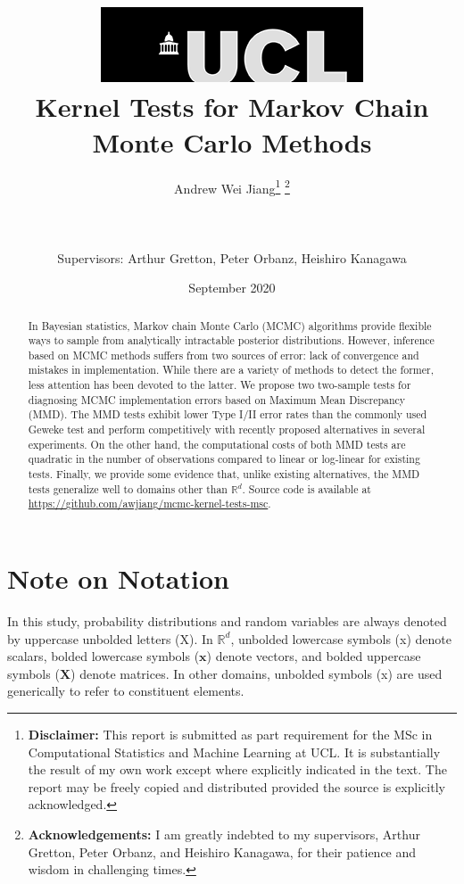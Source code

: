 \documentclass[a4paper,11pt]{article}
\title{  	{ \includegraphics[scale=.5]{figures/ucl_logo.png}}\\
{{\Huge Kernel Tests for Markov Chain Monte Carlo Methods}}\\
		}
\date{September 2020}
\author{Andrew Wei Jiang\thanks{
{\bf Disclaimer:}
This report is submitted as part requirement for the MSc in Computational Statistics and Machine Learning at UCL. It is
substantially the result of my own work except where explicitly indicated in the text. The report may be freely copied and distributed provided the source is explicitly acknowledged.
\newline}
\thanks{
{\bf Acknowledgements:}
I am greatly indebted to my supervisors, Arthur Gretton, Peter Orbanz, and Heishiro Kanagawa, for their patience and wisdom in challenging times.
\newline}
\\ \\
\\ \\
Supervisors: Arthur Gretton, Peter Orbanz, Heishiro Kanagawa}
\begin{document}
\maketitle
\thispagestyle{empty}
\onehalfspacing

\newpage
\begin{abstract}
    In Bayesian statistics, Markov chain Monte Carlo (MCMC) algorithms provide flexible ways to sample from analytically intractable posterior distributions. However, inference based on MCMC methods suffers from two sources of error: lack of convergence and mistakes in implementation. While there are a variety of methods to detect the former, less attention has been devoted to the latter. We propose two two-sample tests for diagnosing MCMC implementation errors based on Maximum Mean Discrepancy (MMD). The MMD tests exhibit lower Type I/II error rates than the commonly used Geweke test \cite{geweke_getting_2004} and perform competitively with recently proposed alternatives in several experiments. On the other hand, the computational costs of both MMD tests are quadratic in the number of observations compared to linear or log-linear for existing tests. Finally, we provide some evidence that, unlike existing alternatives, the MMD tests generalize well to domains other than $\mathbb{R}^{d}$. Source code is available at \url{https://github.com/awjiang/mcmc-kernel-tests-msc}.
\end{abstract}
\setcounter{page}{1}
\newpage

\tableofcontents
\newpage

\section*{Note on Notation}
In this study, probability distributions and random variables are always denoted by uppercase unbolded letters (X). In $\mathbb{R}^{d}$, unbolded lowercase symbols (x) denote scalars, bolded lowercase symbols ($\mathbf{x}$) denote vectors, and bolded uppercase symbols ($\mathbf{X}$) denote matrices. In other domains, unbolded symbols (x) are used generically to refer to constituent elements.

\newpage
\end{document}
